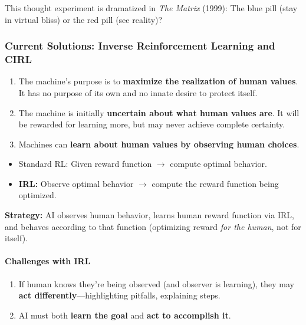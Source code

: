 \begin{tipbox}
This thought experiment is dramatized in \textit{The Matrix} (1999): The blue pill (stay in virtual bliss) or the red pill (see reality)?
\end{tipbox}

\bigseparator

\subsubsection{Current Solutions: Inverse Reinforcement Learning and CIRL}

\begin{keybox}
\begin{enumerate}
  \item The machine's purpose is to \textbf{maximize the realization of human values}. It has no purpose of its own and no innate desire to protect itself.
  \item The machine is initially \textbf{uncertain about what human values are}. It will be rewarded for learning more, but may never achieve complete certainty.
  \item Machines can \textbf{learn about human values by observing human choices}.
\end{enumerate}
\end{keybox}

\begin{defbox}
\begin{itemize}
  \item Standard RL: Given reward function $\to$ compute optimal behavior.
  \item \textbf{IRL:} Observe optimal behavior $\to$ compute the reward function being optimized.
\end{itemize}

\textbf{Strategy:} AI observes human behavior, learns human reward function via IRL, and behaves according to that function (optimizing reward \textit{for the human}, not for itself).
\end{defbox}

\paragraph*{Challenges with IRL}

\begin{enumerate}
  \item If human knows they're being observed (and observer is learning), they may \textbf{act differently}---highlighting pitfalls, explaining steps.
  \item AI must both \textbf{learn the goal} and \textbf{act to accomplish it}.
\end{enumerate}

